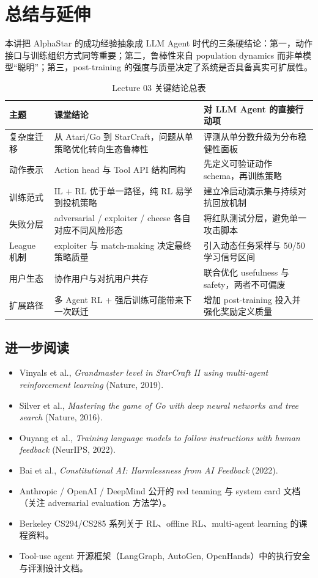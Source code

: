 \section{总结与延伸}

本讲把 AlphaStar 的成功经验抽象成 LLM Agent 时代的三条硬结论：第一，动作接口与训练组织方式同等重要；第二，鲁棒性来自 population dynamics 而非单模型``聪明''；第三，post-training 的强度与质量决定了系统是否具备真实可扩展性。

\begin{table}[H]
\centering
\caption{Lecture 03 关键结论总表}
\begin{tabular}{p{2.8cm}p{4.6cm}p{5.2cm}}
\toprule
主题 & 课堂结论 & 对 LLM Agent 的直接行动项 \\
\midrule
复杂度迁移 & 从 Atari/Go 到 StarCraft，问题从单策略优化转向生态鲁棒性 & 评测从单分数升级为分布稳健性面板 \\
动作表示 & Action head 与 Tool API 结构同构 & 先定义可验证动作 schema，再训练策略 \\
训练范式 & IL + RL 优于单一路径，纯 RL 易学到投机策略 & 建立冷启动演示集与持续对抗回放机制 \\
失败分层 & adversarial / exploiter / cheese 各自对应不同风险形态 & 将红队测试分层，避免单一攻击脚本 \\
League 机制 & exploiter 与 match-making 决定最终策略质量 & 引入动态任务采样与 50/50 学习信号区间 \\
用户生态 & 协作用户与对抗用户共存 & 联合优化 usefulness 与 safety，两者不可偏废 \\
扩展路径 & 多 Agent RL + 强后训练可能带来下一次跃迁 & 增加 post-training 投入并强化奖励定义质量 \\
\bottomrule
\end{tabular}
\end{table}

\subsection*{进一步阅读}
\begin{itemize}
    \item Vinyals et al., \textit{Grandmaster level in StarCraft II using multi-agent reinforcement learning} (Nature, 2019).
    \item Silver et al., \textit{Mastering the game of Go with deep neural networks and tree search} (Nature, 2016).
    \item Ouyang et al., \textit{Training language models to follow instructions with human feedback} (NeurIPS, 2022).
    \item Bai et al., \textit{Constitutional AI: Harmlessness from AI Feedback} (2022).
    \item Anthropic / OpenAI / DeepMind 公开的 red teaming 与 system card 文档（关注 adversarial evaluation 方法学）。
    \item Berkeley CS294/CS285 系列关于 RL、offline RL、multi-agent learning 的课程资料。
    \item Tool-use agent 开源框架（LangGraph, AutoGen, OpenHands）中的执行安全与评测设计文档。
\end{itemize}

